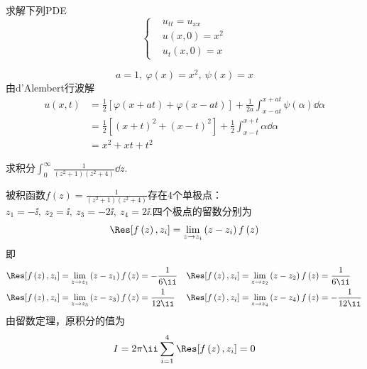 {\begin{exercise}
    求解下列PDE
    $$
    \left\{
        \begin{aligned}
            &u_{tt}=u_{xx}\\
            &u\left(x,0\right)=x^2\\
            &u_t\left(x,0\right)=x
        \end{aligned}
    \right.
    $$
\end{exercise}
\begin{solution}
    $$a=1,\ \varphi\left(x\right)=x^2,\ \psi\left(x\right)=x$$
由d'Alembert行波解
$$
\begin{aligned}
    u\left(x,t\right)&=\frac{1}{2}\left[\varphi\left(x+at\right)+\varphi\left(x-at\right)\right]+\frac{1}{2a}\int_{x-at}^{x+at}{\psi\left(\alpha\right)\dd\alpha}\\
    &=\frac{1}{2}\left[\left(x+t\right)^2+\left(x-t\right)^2\right]+\frac{1}{2}\int_{x-t}^{x+t}{\alpha\dd\alpha}\\
    &=x^2+xt+t^2
\end{aligned}
$$
\end{solution}

\begin{exercise}
    求积分$\int_0^{\infty}{\frac{1}{\left(z^2+1\right)\left(z^2+4\right)}\dd z}$.
\end{exercise}
\begin{solution}
    被积函数$f\left(z\right)=\frac{1}{\left(z^2+1\right)\left(z^2+4\right)}$存在$4$个单极点：$z_1=-\ii,\ z_2=\ii,\ z_3=-2\ii,\ z_4=2\ii$.四个极点的留数分别为
    $$\Res[f\left(z\right),z_i]=\lim_{z\to z_i}\left(z-z_i\right)f\left(z\right)$$
    即
    $$
    \begin{aligned}
        &\Res[f\left(z\right),z_i]=\lim_{z\to z_1}\left(z-z_1\right)f\left(z\right)=-\frac{1}{6\ii}&&\Res[f\left(z\right),z_i]=\lim_{z\to z_2}\left(z-z_2\right)f\left(z\right)=\frac{1}{6\ii}\\
        &\Res[f\left(z\right),z_i]=\lim_{z\to z_3}\left(z-z_3\right)f\left(z\right)=\frac{1}{12\ii}&&\Res[f\left(z\right),z_i]=\lim_{z\to z_4}\left(z-z_4\right)f\left(z\right)=-\frac{1}{12\ii}
    \end{aligned}
    $$
    由留数定理，原积分的值为
    $$I=2\pi\ii\sum_{i=1}^4{\Res[f\left(z\right),z_i]}=0$$
\end{solution}

}
